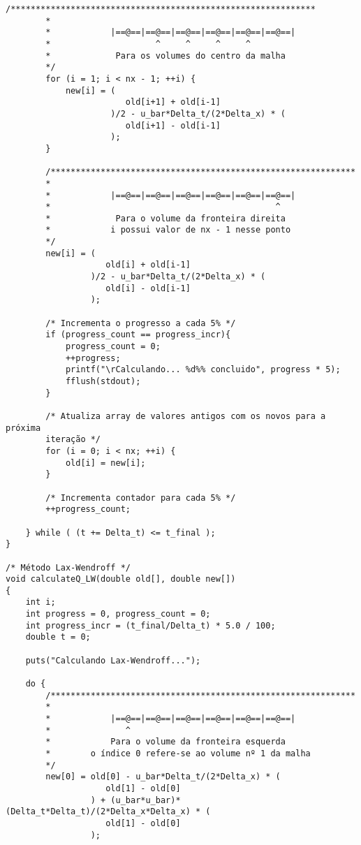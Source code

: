 \begin{Verbatim}[fontsize=\footnotesize]
        /*************************************************************
        *
        *            |==@==|==@==|==@==|==@==|==@==|==@==|
        *                     ^     ^     ^     ^
        *             Para os volumes do centro da malha
        */
        for (i = 1; i < nx - 1; ++i) {
            new[i] = (
                        old[i+1] + old[i-1]
                     )/2 - u_bar*Delta_t/(2*Delta_x) * (
                        old[i+1] - old[i-1]
                     );
        }

        /*************************************************************
        *
        *            |==@==|==@==|==@==|==@==|==@==|==@==|
        *                                             ^
        *             Para o volume da fronteira direita
        *            i possui valor de nx - 1 nesse ponto
        */
        new[i] = (
                    old[i] + old[i-1]
                 )/2 - u_bar*Delta_t/(2*Delta_x) * (
                    old[i] - old[i-1]
                 );

        /* Incrementa o progresso a cada 5% */
        if (progress_count == progress_incr){
            progress_count = 0;
            ++progress;
            printf("\rCalculando... %d%% concluido", progress * 5);
            fflush(stdout);
        }

        /* Atualiza array de valores antigos com os novos para a próxima
        iteração */
        for (i = 0; i < nx; ++i) {
            old[i] = new[i];
        }

        /* Incrementa contador para cada 5% */
        ++progress_count;

    } while ( (t += Delta_t) <= t_final );
}

/* Método Lax-Wendroff */
void calculateQ_LW(double old[], double new[])
{
    int i;
    int progress = 0, progress_count = 0;
    int progress_incr = (t_final/Delta_t) * 5.0 / 100;
    double t = 0;

    puts("Calculando Lax-Wendroff...");

    do {
        /*************************************************************
        *
        *            |==@==|==@==|==@==|==@==|==@==|==@==|
        *               ^
        *            Para o volume da fronteira esquerda
        *        o índice 0 refere-se ao volume nº 1 da malha
        */
        new[0] = old[0] - u_bar*Delta_t/(2*Delta_x) * (
                    old[1] - old[0]
                 ) + (u_bar*u_bar)*(Delta_t*Delta_t)/(2*Delta_x*Delta_x) * (
                    old[1] - old[0]
                 );


\end{Verbatim}
